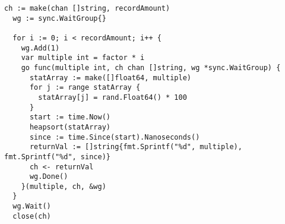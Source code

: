 \documentclass{article}
\begin{document}
\begin{lstlisting}[language=golang, caption=Concurrent sorting benchmark runner]
  ch := make(chan []string, recordAmount)
  wg := sync.WaitGroup{}

  for i := 0; i < recordAmount; i++ {
    wg.Add(1)
    var multiple int = factor * i
    go func(multiple int, ch chan []string, wg *sync.WaitGroup) {
      statArray := make([]float64, multiple)
      for j := range statArray {
        statArray[j] = rand.Float64() * 100
      }
      start := time.Now()
      heapsort(statArray)
      since := time.Since(start).Nanoseconds()
      returnVal := []string{fmt.Sprintf("%d", multiple), fmt.Sprintf("%d", since)}
      ch <- returnVal
      wg.Done()
    }(multiple, ch, &wg)
  }
  wg.Wait()
  close(ch)
\end{lstlisting}


\medskip



\end{document}
